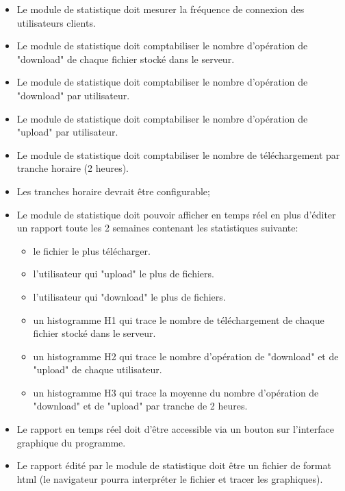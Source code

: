 \documentclass[10pt,a4paper]{report}
\begin{document}
		\begin{itemize}[label = $\triangleright$]
			\item Le module de statistique doit mesurer la fréquence de connexion des utilisateurs clients.

			\item Le module de statistique doit comptabiliser le nombre d'opération de "download" de chaque fichier stocké dans le serveur.

			\item Le module de statistique doit comptabiliser le nombre d'opération de "download" par utilisateur.

			\item Le module de statistique doit comptabiliser le nombre d'opération de "upload" par utilisateur.

			\item Le module de statistique doit comptabiliser le nombre de téléchargement par tranche horaire (2 heures).

			\item Les tranches horaire devrait être configurable;

			\item Le module de statistique doit pouvoir afficher en temps réel en plus d'éditer un rapport toute les 2 semaines contenant les statistiques suivante:

			\begin{itemize}
				\item le fichier le plus télécharger.

				\item l'utilisateur qui "upload" le plus de fichiers.

				\item l'utilisateur qui "download" le plus de fichiers.

				\item un histogramme H1 qui trace le nombre de téléchargement de chaque fichier stocké dans le serveur.

				\item un histogramme H2 qui trace le nombre d'opération de "download" et de "upload" de chaque utilisateur.

				\item un histogramme H3 qui trace la moyenne du nombre d'opération de "download" et de "upload" par tranche de 2 heures.
			\end{itemize}

			\item Le rapport en temps réel doit d'être accessible via un bouton sur l'interface graphique du programme.

			\item Le rapport édité par le module de statistique doit être un fichier de format html (le navigateur pourra interpréter le fichier et tracer les graphiques).
		\end{itemize}
	
\end{document}
